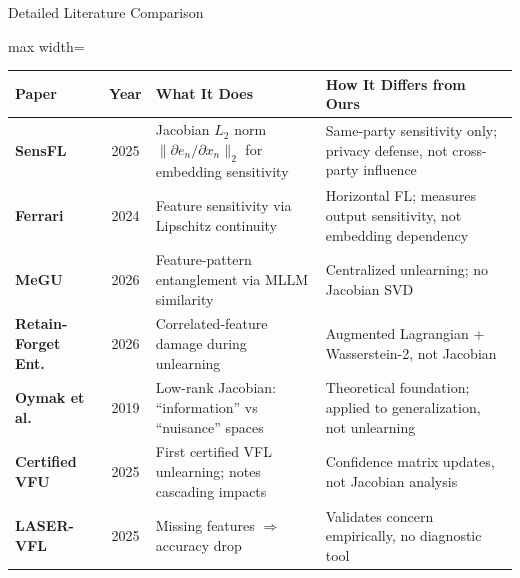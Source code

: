 \documentclass[aspectratio=169, 11pt]{beamer}
\begin{document}
\begin{frame}{Detailed Literature Comparison}
  \begin{adjustbox}{max width=\textwidth}
    \renewcommand{\arraystretch}{1.25}
    \begin{tabular}{>{\bfseries\footnotesize}p{2.2cm} >{\footnotesize}c >{\footnotesize}p{4.0cm} >{\footnotesize}p{5.5cm}}
      \toprule
      \textbf{Paper} & \textbf{Year} & \textbf{What It Does} & \textbf{How It Differs from Ours} \\
      \midrule
      \rowcolor{hlrow}
      SensFL & 2025 & Jacobian $L_2$ norm $\|{\partial e_n}/{\partial x_n}\|_2$ for embedding sensitivity & Same-party sensitivity only; privacy defense, not cross-party influence \\
      Ferrari & 2024 & Feature sensitivity via Lipschitz continuity & Horizontal FL; measures output sensitivity, not embedding dependency \\
      \rowcolor{hlrow}
      MeGU & 2026 & Feature-pattern entanglement via MLLM similarity & Centralized unlearning; no Jacobian SVD \\
      Retain-Forget Ent. & 2026 & Correlated-feature damage during unlearning & Augmented Lagrangian + Wasserstein-2, not Jacobian \\
      \rowcolor{hlrow}
      Oymak et al. & 2019 & Low-rank Jacobian: ``information'' vs ``nuisance'' spaces & Theoretical foundation; applied to generalization, not unlearning \\
      Certified VFU & 2025 & First certified VFL unlearning; notes cascading impacts & Confidence matrix updates, not Jacobian analysis \\
      \rowcolor{hlrow}
      LASER-VFL & 2025 & Missing features $\Rightarrow$ accuracy drop & Validates concern empirically, no diagnostic tool \\
      \bottomrule
    \end{tabular}
  \end{adjustbox}
\end{frame}
\end{document}
